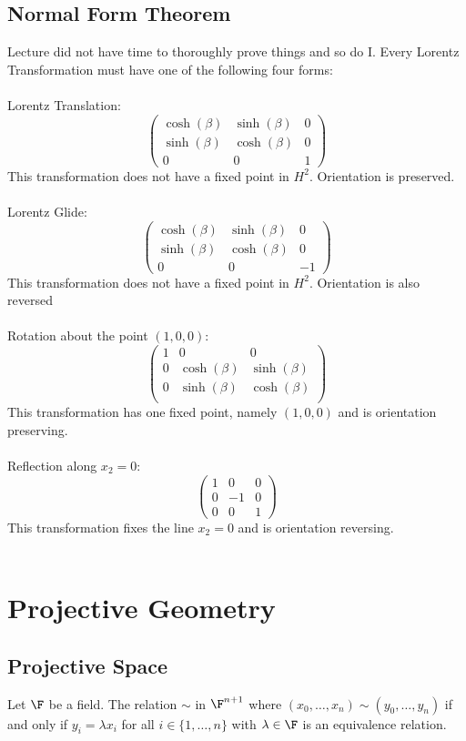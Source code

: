 \subsection{Normal Form Theorem}
Lecture did not have time to thoroughly prove things and so do I. Every Lorentz Transformation must have one of the following four forms: \\~\\
Lorentz Translation: $$\begin{pmatrix}
\cosh(\beta) & \sinh(\beta) & 0\\
\sinh(\beta) & \cosh(\beta) & 0\\
0 & 0 & 1
\end{pmatrix}$$This transformation does not have a fixed point in $H^2$. Orientation is preserved. \\~\\
Lorentz Glide: $$\begin{pmatrix}
\cosh(\beta) & \sinh(\beta) & 0\\
\sinh(\beta) & \cosh(\beta) & 0\\
0 & 0 & -1
\end{pmatrix}$$This transformation does not have a fixed point in $H^2$. Orientation is also reversed\\~\\
Rotation about the point $(1,0,0)$: $$\begin{pmatrix}
1 & 0 & 0\\
0 & \cosh(\beta) & \sinh(\beta)\\
0 & \sinh(\beta) & \cosh(\beta)\\
\end{pmatrix}$$This transformation has one fixed point, namely $(1,0,0)$ and is orientation preserving. \\~\\
Reflection along $x_2=0$: $$\begin{pmatrix}
1 & 0 & 0\\
0 & -1 & 0\\
0 & 0 & 1
\end{pmatrix}$$This transformation fixes the line $x_2=0$ and is orientation reversing. \\~\\

\pagebreak
\section{Projective Geometry}
\subsection{Projective Space}
\begin{lmm}{}{} Let $\F$ be a field. The relation $\sim$ in $\F^{n+1}$ where $(x_0,\dots,x_n)\sim(y_0,\dots,y_n)$ if and only if $y_i=\lambda x_i$ for all $i\in\{1,\dots,n\}$ with $\lambda\in\F$ is an equivalence relation. 
\end{lmm}

